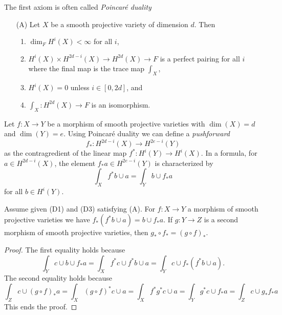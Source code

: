 \medskip\noindent
The first axiom is often called {\it Poincar\'e duality}
\begin{enumerate}
\item[(A)] Let $X$ be a smooth projective variety of dimension $d$. Then
\begin{enumerate}
\item $\dim_F H^i(X) < \infty$ for all $i$,
\item $H^i(X) \times H^{2d - i}(X) \rightarrow H^{2d}(X) \rightarrow F$
is a perfect pairing for all $i$ where the final
map is the trace map $\int_X$,
\item $H^i(X) = 0$ unless $i \in [0, 2d]$, and
\item $\int_X : H^{2d}(X) \to F$ is an isomorphism.
\end{enumerate}
\end{enumerate}
Let $f : X \to Y$ be a morphism of smooth projective varieties
with $\dim(X) = d$ and $\dim(Y) = e$. Using Poincar\'e duality
we can define a {\it pushforward}
$$
f_* : H^{2d - i}(X) \longrightarrow H^{2e - i}(Y)
$$
as the contragredient of the linear map $f^* : H^i(Y) \to H^i(X)$. In a
formula, for $a \in H^{2d - i}(X)$, the element $f_*a \in H^{2e - i}(Y)$
is characterized by
$$
\int_X f^*b \cup a = \int_Y b \cup f_*a
$$
for all $b \in H^i(Y)$.

\begin{lemma}
\label{lemma-pushforward-classical}
Assume given (D1) and (D3) satisfying (A). For $f : X \to Y$
a morphism of smooth projective varieties we have
$f_*(f^*b \cup a) = b \cup f_*a$. If $g : Y \to Z$ is a second morphism
of smooth projective varieties, then $g_* \circ f_* = (g \circ f)_*$.
\end{lemma}

\begin{proof}
The first equality holds because
$$
\int_Y c \cup b \cup f_*a =
\int_X f^*c \cup f^*b \cup a =
\int_Y c \cup f_*(f^*b \cup a).
$$
The second equality holds because
$$
\int_Z c \cup (g \circ f)_*a = \int_X (g \circ f)^*c \cup a =
\int_X f^* g^* c \cup a = \int_Y g^*c \cup f_*a = \int_Z c \cup g_*f_*a
$$
This ends the proof.
\end{proof}

